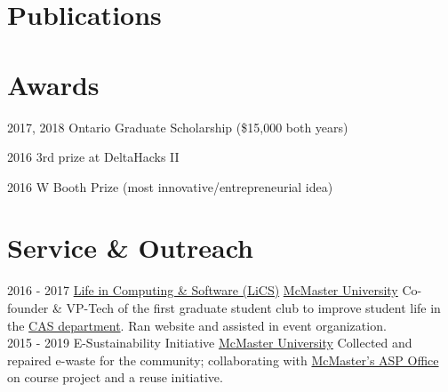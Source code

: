 \documentclass[letterpaper]{twentysecondcv} %
\begin{document}
\begin{twenty}
\end{twenty}
\section{Publications}
\vspace{-.5em}
\printbibliography[heading=none]
\section{Awards}

\vspace{-.5em}
\begin{twenty}
  \twentyitem
  {2017, 2018}
  {}
  {Ontario Graduate Scholarship \textnormal{(\$15,000 both years)}}
	{}
	{}
	{}

	\twentyitem
	{2016}
	{}
	{3rd prize at DeltaHacks II}
	{}
	{}
	{}
	
	\twentyitem
	{2016}
	{}
	{W Booth Prize \textnormal{(most innovative/entrepreneurial idea)}}
	{}
	{}
	{}
\end{twenty}

\vspace{-.5em}
\section{Service \& Outreach}
\vspace{-.5em}
\begin{twenty}
	\twentyitem
	{2016 - 2017}
	{}
	{\href{https://lics.cas.mcmaster.ca/node/17}{Life in Computing \& Software (LiCS)}}
	{\href{https://www.mcmaster.ca/}{McMaster University}}
	{}
	{Co-founder \& VP-Tech of the first graduate student club to improve student life in the \href{https://www.eng.mcmaster.ca/cas}{CAS department}. Ran website and assisted in event organization.}
\\
\twentyitem
{2015 - 2019}
{}
{E-Sustainability Initiative}
{\href{https://www.mcmaster.ca/}{McMaster University}}
{}
{Collected and repaired e-waste for the community; collaborating with \href{https://asp.mcmaster.ca/}{McMaster's ASP Office} on course project and a reuse initiative.}
\end{twenty}
\end{document}
